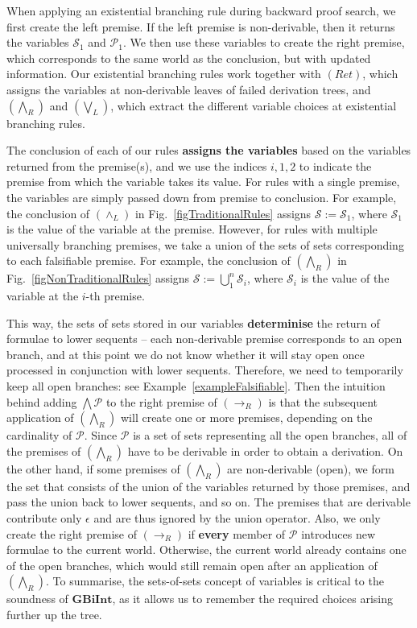 \documentclass{llncs}
\numberwithin{equation}{section}
\newcommand{\Pred}{{\mathcal{P}}}
\newcommand{\Succ}{{\mathcal{S}}}
\newcommand{\ExAnd}{\wedge}
\newcommand{\Imp}{\rightarrow}
\newcommand{\GBiInt}{\mathbf{GBiInt}}
\newcommand{\AndLeftRule}{(\ExAnd_L)}
\newcommand{\ImpRightRule}{({\Imp_R})}
\newcommand{\SpecialRightRule}{({\bigwedge_R})}
\newcommand{\SpecialLeftRule}{({\bigvee_L})}
\newcommand{\ReturnRule}{(Ret)}
\begin{document}
When applying an existential branching rule during backward proof search, we first create the left premise. If the left premise is non-derivable, then it returns the variables $\Succ_1$ and $\Pred_1$. We then use these variables to create the right premise, which corresponds to the same world as the conclusion, but with updated information. Our existential branching rules work together with $\ReturnRule$, which assigns the variables at non-derivable leaves of failed derivation trees, and $\SpecialRightRule$ and $\SpecialLeftRule$, which extract the different variable choices at existential branching rules.

The conclusion of each of our rules \textbf{assigns the variables} based on the
variables returned from the premise(s), and we use the indices $i, 1, 2$ to indicate the premise from which the variable takes its value. For rules with a single premise, the variables are simply passed down from premise to
conclusion. For example, the conclusion of $\AndLeftRule$ in Fig.~\ref{figTraditionalRules} assigns $\Succ := \Succ_1$, where $\Succ_1$ is the value of the variable at the premise. However, for rules with multiple universally branching
premises, we take a union of the sets of sets corresponding to each
falsifiable premise. For example, the conclusion of $\SpecialRightRule$ in Fig.~\ref{figNonTraditionalRules} assigns $\Succ := \bigcup_1^n \Succ_i$, where $\Succ_i$ is the value of the variable at the $i$-th premise.

This way, the sets of sets stored in our variables \textbf{determinise} the return of
formulae to lower sequents -- each non-derivable premise corresponds to an open
branch, and at this point we do not know whether it will stay open
once processed in conjunction with lower sequents. Therefore, we need
to temporarily keep all open branches: see Example~\ref{exampleFalsifiable}. Then the intuition behind adding $\bigwedge \Pred$
to the right premise of $\ImpRightRule$ is that the subsequent
application of $\SpecialRightRule$ will create one or more premises,
depending on the cardinality of $\Pred$. Since $\Pred$ is a set of
sets representing all the open branches, all of the premises of
$\SpecialRightRule$ have to be derivable in order to obtain a
derivation. On the other hand, if some premises of $\SpecialRightRule$
are non-derivable (open), we form the set that consists of the union
of the variables returned by those premises, and pass the union back
to lower sequents, and so on. The premises that are derivable
contribute only $\epsilon$ and are thus ignored by the union operator.
Also, we only create the right premise of $\ImpRightRule$ if
\textbf{every} member of $\Pred$ introduces new formulae to the
current world. Otherwise, the current world already contains one of
the open branches, which would still remain open after an application
of $\SpecialRightRule$. To summarise, the sets-of-sets concept of variables is critical to the soundness of $\GBiInt$, as it allows us to remember the required choices arising further up the tree.
\end{document}

